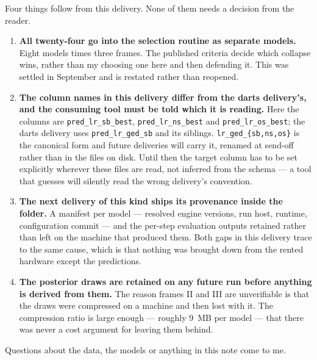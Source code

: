 Four things follow from this delivery. None of them needs a decision from the reader.

\begin{enumerate}
    \item \textbf{All twenty-four go into the selection routine as separate models.} Eight models
          times three frames. The published criteria decide which collapse wins, rather than my
          choosing one here and then defending it. This was settled in September and is restated
          rather than reopened.

    \item \textbf{The column names in this delivery differ from the darts delivery's, and the
          consuming tool must be told which it is reading.} Here the columns are
          \texttt{pred\_lr\_sb\_best}, \texttt{pred\_lr\_ns\_best} and
          \texttt{pred\_lr\_os\_best}; the darts delivery uses \texttt{pred\_lr\_ged\_sb} and its
          siblings. \texttt{lr\_ged\_\{sb,ns,os\}} is the canonical form and future deliveries
          will carry it, renamed at send-off rather than in the files on disk. Until then the
          target column has to be set explicitly wherever these files are read, not inferred from
          the schema --- a tool that guesses will silently read the wrong delivery's convention.

    \item \textbf{The next delivery of this kind ships its provenance inside the folder.} A
          manifest per model --- resolved engine versions, run host, runtime, configuration
          commit --- and the per-step evaluation outputs retained rather than left on the machine
          that produced them. Both gaps in this delivery trace to the same cause, which is that
          nothing was brought down from the rented hardware except the predictions.

    \item \textbf{The posterior draws are retained on any future run before anything is derived
          from them.} The reason frames II and III are unverifiable is that the draws were
          compressed on a machine and then lost with it. The compression ratio is large enough ---
          roughly 9~MB per model --- that there was never a cost argument for leaving them
          behind.
\end{enumerate}

\noindent Questions about the data, the models or anything in this note come to me.
